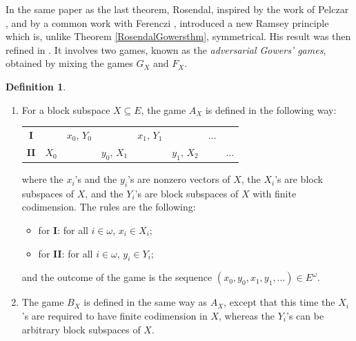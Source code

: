 \documentclass[a4paper,11pt]{article}
\makeatletter
\theoremstyle{definition}
\newtheorem{defin}[thm]{Definition}
\numberwithin{equation}{section}
\newcommand{\alaligne}{~\vspace*{\topsep}\nobreak\@afterheading}
\makeatother
\begin{document}
\smallskip

In the same paper as the last theorem, Rosendal, inspired by the work of Pelczar \cite{Pelczar}, and by a common work with Ferenczi \cite{fero}, introduced a new Ramsey principle
which is, unlike Theorem \ref{RosendalGowersthm}, symmetrical. His result was then refined in \cite{Rosendaladverse}. It involves two games, known as the \emph{adversarial Gowers' games}, obtained by mixing the games $G_X$ and $F_X$.

\begin{defin}

\alaligne

\begin{enumerate}

\item For a block subspace $X \subseteq E$, the game $A_X$ is defined in the following way:

\smallskip

\begin{tabular}{cccccccc}
\textbf{I} & & $x_0, \, Y_0$ & & $x_1, \, Y_1$ & & $\hdots$ \\
\textbf{II} & $X_0$ & & $y_0, \, X_1$ & & $y_1, \, X_2 $ & & $\hdots$ 
\end{tabular}

\smallskip

\noindent where the $x_i$'s and the $y_i$'s are nonzero vectors of $X$, the $X_i$'s are block subspaces of $X$, and the $Y_i$'s are block subspaces of $X$ with finite codimension. The rules are the following:

\begin{itemize}

\item for \textbf{I}: for all $i \in \omega$, $x_i \in X_i$;

\item for \textbf{II}: for all $i \in \omega$, $y_i \in Y_i$;

\end{itemize}

\noindent and the outcome of the game is the sequence $(x_0, y_0, x_1, y_1, \ldots) \in E^\omega$.

\item The game $B_X$ is defined in the same way as $A_X$, except that this time the $X_i$'s are required to have finite codimension in $X$, whereas the $Y_i$'s can be arbitrary block subspaces of $X$.

\end{enumerate}

\end{defin}
\end{document}
